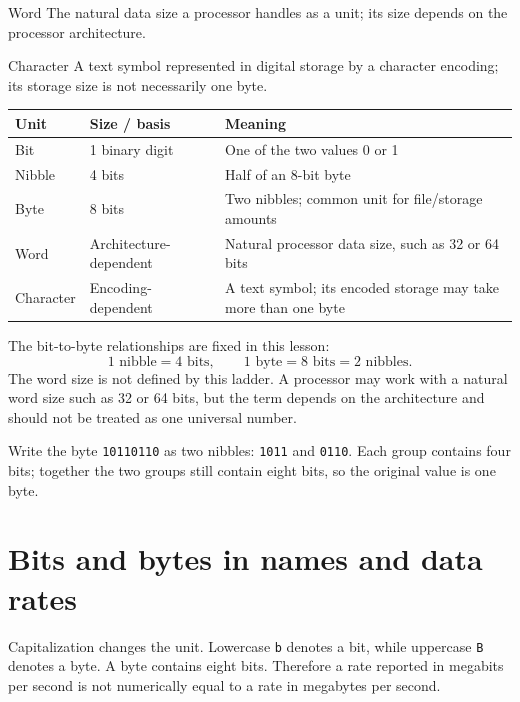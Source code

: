 \begin{definitionbox}{Word}
The natural data size a processor handles as a unit; its size depends on the
processor architecture.
\end{definitionbox}

\begin{definitionbox}{Character}
A text symbol represented in digital storage by a character encoding; its
storage size is not necessarily one byte.
\end{definitionbox}

\begin{center}
\begin{tabular}{p{}p{}p{}}
\toprule
\textbf{Unit} & \textbf{Size / basis} & \textbf{Meaning}\\
\midrule
Bit & 1 binary digit & One of the two values 0 or 1\\
Nibble & 4 bits & Half of an 8-bit byte\\
Byte & 8 bits & Two nibbles; common unit for file/storage amounts\\
Word & Architecture-dependent & Natural processor data size, such as 32 or 64 bits\\
Character & Encoding-dependent & A text symbol; its encoded storage may take more than one byte\\
\bottomrule
\end{tabular}
\end{center}

The bit-to-byte relationships are fixed in this lesson:
\[
  1\text{ nibble}=4\text{ bits},\qquad
  1\text{ byte}=8\text{ bits}=2\text{ nibbles}.
\]
The word size is not defined by this ladder. A processor may work with a
natural word size such as 32 or 64 bits, but the term depends on the
architecture and should not be treated as one universal number.

\begin{example}
Write the byte \texttt{10110110} as two nibbles: \texttt{1011} and
\texttt{0110}. Each group contains four bits; together the two groups still
contain eight bits, so the original value is one byte.
\end{example}

\section{Bits and bytes in names and data rates}
Capitalization changes the unit. Lowercase \texttt{b} denotes a bit, while
uppercase \texttt{B} denotes a byte. A byte contains eight bits. Therefore a
rate reported in megabits per second is not numerically equal to a rate in
megabytes per second.

